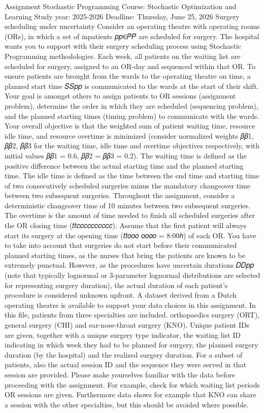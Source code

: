 Assignment Stochastic Programming
Course: Stochastic Optimization and Learning
Study year: 2025-2026
Deadline: Thursday, June 25, 2026
Surgery scheduling under uncertainty
Consider an operating theatre with operating rooms (ORs), in which a set of inpatients 𝑝𝑝∈𝑃𝑃 are scheduled for surgery. The hospital wants you to support with their surgery scheduling process using Stochastic Programming methodologies. Each week, all patients on the waiting list are scheduled for surgery, assigned to an OR-day and sequenced within that OR. To ensure patients are brought from the wards to the operating theatre on time, a planned start time 𝑆𝑆𝑝𝑝 is communicated to the wards at the start of their shift.
Your goal is amongst others to assign patients to OR sessions (assignment problem), determine the order in which they are scheduled (sequencing problem), and the planned starting times (timing problem) to communicate with the wards. Your overall objective is that the weighted sum of patient waiting time, resource idle time, and resource overtime is minimized (consider normalized weights 𝛽𝛽1, 𝛽𝛽2, 𝛽𝛽3 for the waiting time, idle time and overtime objectives respectively, with initial values 𝛽𝛽1 = 0.6, 𝛽𝛽2 = 𝛽𝛽3 = 0.2). The waiting time is defined as the positive difference between the actual starting time and the planned starting time. The idle time is defined as the time between the end time and starting time of two consecutively scheduled surgeries minus the mandatory changeover time between two subsequent surgeries. Throughout the assignment, consider a deterministic changeover time of 10 minutes between two subsequent surgeries. The overtime is the amount of time needed to finish all scheduled surgeries after the OR closing time (𝑡𝑡𝑐𝑐𝑐𝑐𝑐𝑐𝑐𝑐𝑐𝑐).
Assume that the first patient will always start its surgery at the opening time (𝑡𝑡𝑜𝑜𝑜 𝑜𝑜𝑜𝑜 = 8:00ℎ) of each OR. You have to take into account that surgeries do not start before their communicated planned starting times, as the nurses that bring the patients are known to be extremely punctual. However, as the procedures have uncertain durations 𝐷𝐷𝑝𝑝 (note that typically lognormal or 3-parameter lognormal distributions are selected for representing surgery duration), the actual duration of each patient’s procedure is considered unknown upfront.
A dataset derived from a Dutch operating theatre is available to support your data choices in this assignment. In this file, patients from three specialties are included. orthopaedics surgery (ORT), general surgery (CHI) and ear-nose-throat surgery (KNO).
Unique patient IDs are given, together with a unique surgery type indicator, the waiting list ID indicating in which week they had to be planned for surgery, the planned surgery duration (by the hospital) and the realized surgery duration. For a subset of patients, also the actual session ID and the sequence they were served in that session are provided. Please make yourselves familiar with the data before proceeding with the assignment. For example, check for which waiting list periods OR sessions are given. Furthermore data shows for example that KNO can share a session with the other specialties, but this should be avoided where possible.

